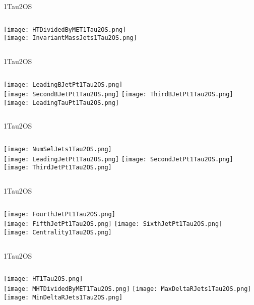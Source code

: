 \documentclass{beamer}
\begin{document}
\begin{frame}{1Tau2OS}
    \begin{columns}[t]
    \centering
    \texttt{[image: HTDividedByMET1Tau2OS.png]}\\
    \centering
    \texttt{[image: InvariantMassJets1Tau2OS.png]}
    \end{columns}
\end{frame}
\begin{frame}{1Tau2OS}
    \begin{columns}[t]
    \centering
    \texttt{[image: LeadingBJetPt1Tau2OS.png]}\\
    \texttt{[image: SecondBJetPt1Tau2OS.png]}
    \centering
    \texttt{[image: ThirdBJetPt1Tau2OS.png]}\\
    \texttt{[image: LeadingTauPt1Tau2OS.png]}
    \end{columns}
\end{frame}
\begin{frame}{1Tau2OS}
    \begin{columns}[t]
    \centering
    \texttt{[image: NumSelJets1Tau2OS.png]}\\
    \texttt{[image: LeadingJetPt1Tau2OS.png]}
    \centering
    \texttt{[image: SecondJetPt1Tau2OS.png]}\\
    \texttt{[image: ThirdJetPt1Tau2OS.png]}
    \end{columns}
\end{frame}
\begin{frame}{1Tau2OS}
    \begin{columns}[t]
    \centering
    \texttt{[image: FourthJetPt1Tau2OS.png]}\\
    \texttt{[image: FifthJetPt1Tau2OS.png]}
    \centering
    \texttt{[image: SixthJetPt1Tau2OS.png]}\\
    \texttt{[image: Centrality1Tau2OS.png]}
    \end{columns}
\end{frame}
\begin{frame}{1Tau2OS}
    \begin{columns}[t]
    \centering
    \texttt{[image: HT1Tau2OS.png]}\\
    \texttt{[image: MHTDividedByMET1Tau2OS.png]}
    \centering
    \texttt{[image: MaxDeltaRJets1Tau2OS.png]}\\
    \texttt{[image: MinDeltaRJets1Tau2OS.png]}
    \end{columns}
\end{frame}
\end{document}
